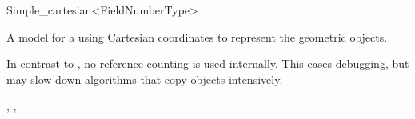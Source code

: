 \begin{ccRefClass}{Simple_cartesian<FieldNumberType>}

\ccDefinition
A model for a  using Cartesian coordinates to represent the
geometric objects. 

\ccRefines
{}

\ccTypes
{}
\ccGlue
{}

\ccImplementation In contrast to , no reference counting
is used internally. This eases debugging, but may slow down algorithms
that copy objects intensively.

\ccSeeAlso
{}, ,
\end{ccRefClass}
